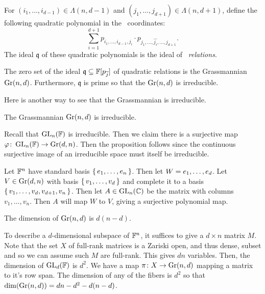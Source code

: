 \documentclass[letterpaper, 11pt]{amsart}
\newif\iffull
\begin{document}
\begin{defn}
  For $(i_1, \ldots, i_{d - 1}) \in \Lambda(n, d - 1)$ and $(j_1, \ldots, j_{d + 1}) \in \Lambda(n, d + 1)$, define the following quadratic polynomial in the \Plucker\ coordinates:
  \[
    \sum_{i = 1}^{d + 1} p_{i_1, \ldots, i_{d - 1}, j_i} \cdot p_{j_1, \ldots, \widehat{j_i}, \ldots, j_{d + 1}}.
  \]
  The ideal $\mathfrak{q}$ of these quadratic polynomials is the ideal of \emph{\Plucker\ relations}.
\end{defn}


\begin{prop}\label{prop:Gr_ideal}
  The zero set of the ideal $\mathfrak{q} \subseteq \mathbb{F}[p_{\overline{j}}]$ of quadratic relations is the Grassmannian $\operatorname{Gr}(n, d)$.
  Furthermore, $\mathfrak{q}$ is prime so that the $\operatorname{Gr}(n, d)$ is irreducible.
\end{prop}

\iffull
\clearpage
\fi

Here is another way to see that the Grassmannian is irreducible.

\begin{prop}\label{prop:Gr_irred}
  The Grassmannian $\operatorname{Gr}(n, d)$ is irreducible.
\end{prop}
\begin{pf}
  Recall that $\operatorname{GL}_n(\mathbb{F})$ is irreducible.
  Then we claim there is a surjective map $\varphi\colon \operatorname{GL}_n(\mathbb{F}) \to \operatorname{Gr}(d, n)$.
  Then the proposition follows since the continuous surjective image of an irreducible space must itself be irreducible.

  Let $\mathbb{F}^n$ have standard basis $\set{e_1, \ldots, e_n}$.
  Then let $W = \gen{e_1, \ldots, e_d}$.
  Let $V \in \operatorname{Gr}(d, n)$ with basis $\set{v_1, \ldots, v_d}$ and complete it to a basis $\set{v_1, \ldots, v_d, v_{d + 1}, v_n}$.
  Then let $A \in \operatorname{GL}_n(\mathbb{C})$ be the matrix with columns $v_1, \ldots, v_n$.
  Then $A$ will map $W$ to $V$, giving a surjective polynomial map.
\end{pf}

\iffull

\begin{prop}\label{prop:gr_dim}
  The dimension of $\operatorname{Gr}(n, d)$ is $d(n - d)$.
\end{prop}
\begin{pf}
  To describe a $d$-dimensional subspace of $\mathbb{F}^n$, it suffices to give a $d \times n$ matrix $M$.
  Note that the set $X$ of full-rank matrices is a Zariski open, and thus dense, subset and so we can assume such $M$ are full-rank.
  This gives $dn$ variables.
  Then, the dimension of $\operatorname{GL}_d(\mathbb{F})$ is $d^2$.
  We have a map $\pi\colon X \to \operatorname{Gr}(n, d)$ mapping a matrix to it's row span.
  The dimension of any of the fibers is $d^2$ so that $\dim(\operatorname{Gr}(n, d)) = dn - d^2 - d(n - d)$.
\end{pf}
\end{document}
